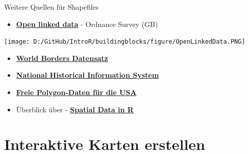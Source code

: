 \documentclass[ignorenonframetext,]{beamer}
\providecommand{\tightlist}{%
  \setlength{\itemsep}{0pt}\setlength{\parskip}{0pt}}
\begin{document}
\begin{frame}{Weitere Quellen für Shapefiles}
\protect\hypertarget{weitere-quellen-fur-shapefiles}{}

\begin{itemize}
\tightlist
\item
  \href{https://www.ordnancesurvey.co.uk/business-and-government/products/opendata-products-grid.html}{\textbf{Open
  linked data}} - Ordnance Survey (GB)
\end{itemize}

\texttt{[image: D:/GitHub/IntroR/buildingblocks/figure/OpenLinkedData.PNG]}

\begin{itemize}
\item
  \href{http://thematicmapping.org/downloads/world_borders.php}{\textbf{World
  Borders Datensatz}}
\item
  \href{https://www.nhgis.org/}{\textbf{National Historical Information
  System}}
\item
  \href{http://www.freemapdata.com/html/free_polygon_data.html}{\textbf{Freie
  Polygon-Daten für die USA}}
\item
  Überblick über -
  \href{https://science.nature.nps.gov/im/datamgmt/statistics/r/advanced/spatial.cfm}{\textbf{Spatial
  Data in R}}
\end{itemize}

\end{frame}

\hypertarget{interaktive-karten-erstellen}{%
\section{Interaktive Karten
erstellen}\label{interaktive-karten-erstellen}}
\end{document}
